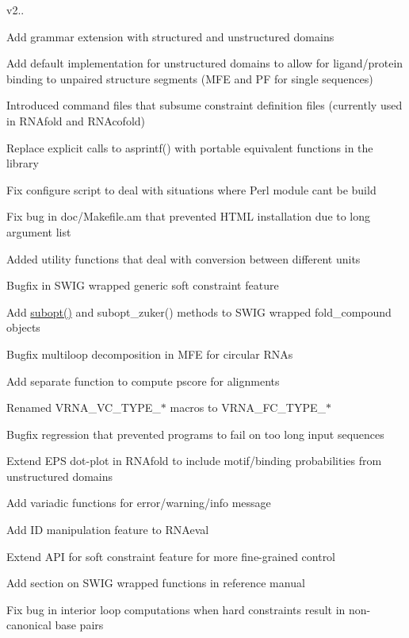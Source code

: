 v2..
\begin{DoxyItemize}
\item Add grammar extension with structured and unstructured domains
\item Add default implementation for unstructured domains to allow for ligand/protein binding to unpaired structure segments (M\+FE and PF for single sequences)
\item Introduced command files that subsume constraint definition files (currently used in R\+N\+Afold and R\+N\+Acofold)
\item Replace explicit calls to asprintf() with portable equivalent functions in the library
\item Fix configure script to deal with situations where Perl module can\textquotesingle{}t be build
\item Fix bug in doc/\+Makefile.\+am that prevented H\+T\+ML installation due to long argument list
\item Added utility functions that deal with conversion between different units
\item Bugfix in S\+W\+IG wrapped generic soft constraint feature
\item Add \mbox{\hyperlink{group__subopt__wuchty_ga700f662506a233e42dd7fda74fafd40e}{subopt()}} and subopt\+\_\+zuker() methods to S\+W\+IG wrapped fold\+\_\+compound objects
\item Bugfix multiloop decomposition in M\+FE for circular R\+N\+As
\item Add separate function to compute pscore for alignments
\item Renamed V\+R\+N\+A\+\_\+\+V\+C\+\_\+\+T\+Y\+P\+E\+\_\+$\ast$ macros to V\+R\+N\+A\+\_\+\+F\+C\+\_\+\+T\+Y\+P\+E\+\_\+$\ast$
\item Bugfix regression that prevented programs to fail on too long input sequences
\item Extend E\+PS dot-\/plot in R\+N\+Afold to include motif/binding probabilities from unstructured domains
\item Add variadic functions for error/warning/info message
\item Add ID manipulation feature to R\+N\+Aeval
\item Extend A\+PI for soft constraint feature for more fine-\/grained control
\item Add section on S\+W\+IG wrapped functions in reference manual
\item Fix bug in interior loop computations when hard constraints result in non-\/canonical base pairs
\end{DoxyItemize}

